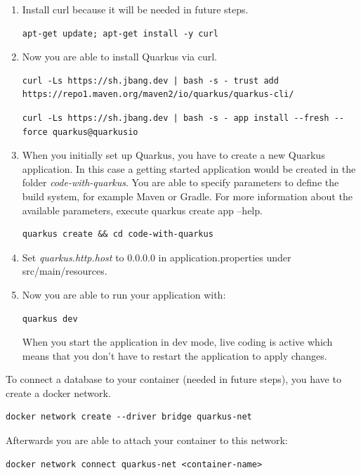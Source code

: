     \begin{enumerate}
        \item Install curl because it will be needed in future steps.
        \begin{lstlisting}[style=bash] 
apt-get update; apt-get install -y curl
        \end{lstlisting}
        \item Now you are able to install Quarkus via curl.
        \begin{lstlisting}[style=bash] 
curl -Ls https://sh.jbang.dev | bash -s - trust add https://repo1.maven.org/maven2/io/quarkus/quarkus-cli/
        \end{lstlisting}

        \begin{lstlisting}[style=bash] 
curl -Ls https://sh.jbang.dev | bash -s - app install --fresh --force quarkus@quarkusio
        \end{lstlisting}

        \item When you initially set up Quarkus, you have to create a new Quarkus application. In this case a getting started application would be created in the folder \textit{code-with-quarkus}. You are able to specify parameters to define the build system, for example Maven or Gradle. For more information about the available parameters, execute quarkus create app --help.
        \begin{lstlisting}[style=bash] 
quarkus create && cd code-with-quarkus
        \end{lstlisting}
        \item Set \textit{quarkus.http.host} to 0.0.0.0 in application.properties under src/main/resources.
        \item Now you are able to run your application with:
        \begin{lstlisting}[style=bash]
quarkus dev
        \end{lstlisting}
        When you start the application in dev mode, live coding is active which means that you don't have to restart the application to apply changes.
    \end{enumerate}
    To connect a database to your container (needed in future steps), you have to create a docker network. 
    \begin{lstlisting}[style=bash]
docker network create --driver bridge quarkus-net
    \end{lstlisting}
    Afterwards you are able to attach your container to this network: 
    \begin{lstlisting}[style=bash]
docker network connect quarkus-net <container-name>
    \end{lstlisting}

